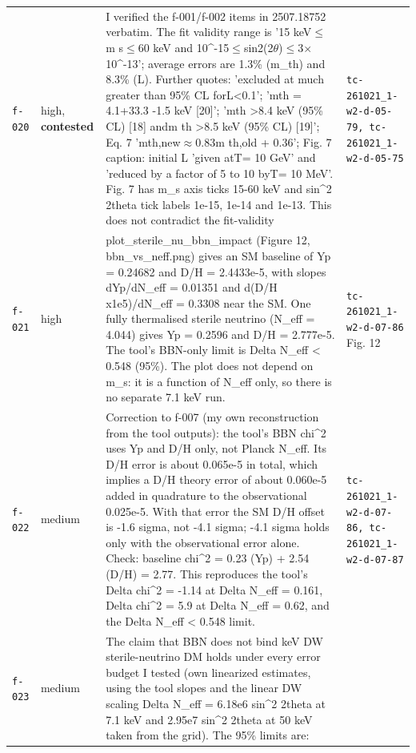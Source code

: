 \documentclass[11pt,a4paper]{article}
\begin{document}
\begin{longtable}{@{}p{}p{}p{}p{}@{}}
\texttt{f-020} & high, \textbf{contested} & I verified the f-001/f-002 items in 2507.18752 verbatim. The fit validity range is '15 keV$\leq$m s$\leq$60 keV and 10\textasciicircum{}-15$\leq$sin2(2$\theta$)$\leq$3$\times$10\textasciicircum{}-13'; average errors are 1.3\% (m\_th) and 8.3\% (L). Further quotes: 'excluded at much greater than 95\% CL forL\textless{}0.1'; 'mth = 4.1+33.3 -1.5 keV [20]'; 'mth \textgreater{}8.4 keV (95\% CL) [18] andm th \textgreater{}8.5 keV (95\% CL) [19]'; Eq. 7 'mth,new$\approx$0.83m th,old + 0.36'; Fig. 7 caption: initial L 'given atT= 10 GeV' and 'reduced by a factor of 5 to 10 byT= 10 MeV'. Fig. 7 has m\_s axis ticks 15-60 keV and sin\textasciicircum{}2 2theta tick labels 1e-15, 1e-14 and 1e-13. This does not contradict the fit-validity  & \texttt{tc-261021\_\allowbreak{}1-w2-d-05-79,\allowbreak{} tc-261021\_\allowbreak{}1-w2-d-05-75} \\
\texttt{f-021} & high & plot\_sterile\_nu\_bbn\_impact (Figure 12, bbn\_vs\_neff.png) gives an SM baseline of Yp = 0.24682 and D/H = 2.4433e-5, with slopes dYp/dN\_eff = 0.01351 and d(D/H x1e5)/dN\_eff = 0.3308 near the SM. One fully thermalised sterile neutrino (N\_eff = 4.044) gives Yp = 0.2596 and D/H = 2.777e-5. The tool's BBN-only limit is Delta N\_eff \textless{} 0.548 (95\%). The plot does not depend on m\_s: it is a function of N\_eff only, so there is no separate 7.1 keV run. & \texttt{tc-261021\_\allowbreak{}1-w2-d-07-86} Fig. 12 \\
\texttt{f-022} & medium & Correction to f-007 (my own reconstruction from the tool outputs): the tool's BBN chi\textasciicircum{}2 uses Yp and D/H only, not Planck N\_eff. Its D/H error is about 0.065e-5 in total, which implies a D/H theory error of about 0.060e-5 added in quadrature to the observational 0.025e-5. With that error the SM D/H offset is -1.6 sigma, not -4.1 sigma; -4.1 sigma holds only with the observational error alone. Check: baseline chi\textasciicircum{}2 = 0.23 (Yp) + 2.54 (D/H) = 2.77. This reproduces the tool's Delta chi\textasciicircum{}2 = -1.14 at Delta N\_eff = 0.161, Delta chi\textasciicircum{}2 = 5.9 at Delta N\_eff = 0.62, and the Delta N\_eff \textless{} 0.548 limit. & \texttt{tc-261021\_\allowbreak{}1-w2-d-07-86,\allowbreak{} tc-261021\_\allowbreak{}1-w2-d-07-87} \\
\texttt{f-023} & medium & The claim that BBN does not bind keV DW sterile-neutrino DM holds under every error budget I tested (own linearized estimates, using the tool slopes and the linear DW scaling Delta N\_eff = 6.18e6 sin\textasciicircum{}2 2theta at 7.1 keV and 2.95e7 sin\textasciicircum{}2 2theta at 50 keV taken from the grid). The 95\% limits are:

\end{longtable}
\end{document}
